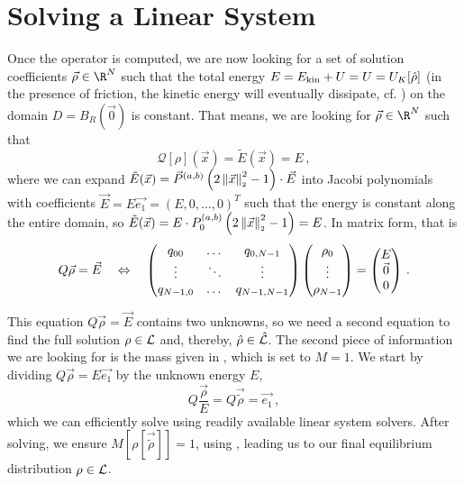 \section{Solving a Linear System}
Once the operator is computed, we are now looking for a set of solution coefficients $\vec{\rho} \in \R^N$ such that the total energy $E = E_{\rm kin} + U = U = U_K[\hat{\rho}]$ (in the presence of friction, the kinetic energy will eventually dissipate, cf. ) on the domain $D = B_R(\vec{0})$ is constant.
That means, we are looking for $\vec{\rho} \in \R^N$ such that
\begin{equation}
  \mathcal{Q}[\rho](\vec{x}) = \tilde{E}(\vec{x}) = E\,,
\end{equation}
where we can expand $\tilde{E}(\vec{x}) = \vec{P}^{(a, b)}\left(2 \left\lVert\vec{x}\right\rVert_{\scriptscriptstyle 2}^2 - 1\right) \cdot \vec{E}$ into Jacobi polynomials with coefficients $\vec{E} = E \vec{e_1} = (E, 0, ..., 0)^T$ such that the energy is constant along the entire domain, so $\tilde{E}(\vec{x}) = E \cdot P_0^{(a, b)}\left(2 \left\lVert\vec{x}\right\rVert_{\scriptscriptstyle 2}^2 - 1\right) = E$.
In matrix form, that is
$$Q \vec{\rho} = \vec{E} \quad\Leftrightarrow\quad \begin{pmatrix}
    q_{00}    & \dots  & q_{0,N-1}   \\
    \vdots    & \ddots & \vdots      \\
    q_{N-1,0} & \dots  & q_{N-1,N-1} \\
  \end{pmatrix} \begin{pmatrix}
    \rho_0 \\
    \vdots \\
    \rho_{N-1}
  \end{pmatrix} = \begin{pmatrix}
    E       \\
    \vec{0} \\
    0
  \end{pmatrix}\,.$$

This equation $Q \vec{\rho} = \vec{E}$ contains two unknowns, so we need a second equation to find the full solution $\rho \in \mathcal{L}$ and, thereby, $\hat{\rho} \in \hat{\mathcal{L}}$.
The second piece of information we are looking for is the mass given in , which is set to $M = 1$. We start by dividing $Q \vec{\rho} = E \vec{e_1}$ by the unknown energy $E$,
\begin{equation}
  Q \frac{\vec{\rho}}{E} = Q \vec{\tilde{\rho}} = \vec{e_1}\,,
  \label{eq:the-linear-system}
\end{equation}
which we can efficiently solve using readily available linear system solvers.
After solving, we ensure $M\left[\rho[\vec{\tilde{\rho}}]\right] = 1$, using , leading us to our final equilibrium distribution $\rho \in \mathcal{L}$.

